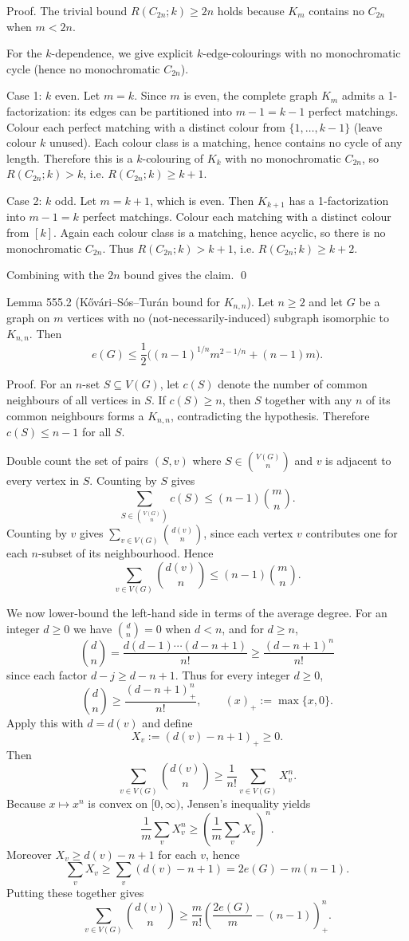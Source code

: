 Proof.
The trivial bound $R(C_{2n};k)\ge 2n$ holds because $K_m$ contains no $C_{2n}$ when $m<2n$.

For the $k$-dependence, we give explicit $k$-edge-colourings with no monochromatic cycle (hence no monochromatic $C_{2n}$).

Case 1: $k$ even.
Let $m=k$. Since $m$ is even, the complete graph $K_m$ admits a 1-factorization: its edges can be partitioned into $m-1=k-1$ perfect matchings.
Colour each perfect matching with a distinct colour from $\{1,\dots,k-1\}$ (leave colour $k$ unused).
Each colour class is a matching, hence contains no cycle of any length.
Therefore this is a $k$-colouring of $K_k$ with no monochromatic $C_{2n}$, so $R(C_{2n};k)>k$, i.e. $R(C_{2n};k)\ge k+1$.

Case 2: $k$ odd.
Let $m=k+1$, which is even.
Then $K_{k+1}$ has a 1-factorization into $m-1=k$ perfect matchings.
Colour each matching with a distinct colour from $[k]$.
Again each colour class is a matching, hence acyclic, so there is no monochromatic $C_{2n}$.
Thus $R(C_{2n};k)>k+1$, i.e. $R(C_{2n};k)\ge k+2$.

Combining with the $2n$ bound gives the claim.
\qed

Lemma 555.2 (K\H{o}v\'ari--S\'os--Tur\'an bound for $K_{n,n}$).
Let $n\ge 2$ and let $G$ be a graph on $m$ vertices with no (not-necessarily-induced) subgraph isomorphic to $K_{n,n}$.
Then
\[
e(G)\le \frac12\Big((n-1)^{1/n} m^{2-1/n}+(n-1)m\Big).
\]

Proof.
For an $n$-set $S\subseteq V(G)$, let $c(S)$ denote the number of common neighbours of all vertices in $S$.
If $c(S)\ge n$, then $S$ together with any $n$ of its common neighbours forms a $K_{n,n}$, contradicting the hypothesis.
Therefore $c(S)\le n-1$ for all $S$.

Double count the set of pairs $(S,v)$ where $S\in\binom{V(G)}{n}$ and $v$ is adjacent to every vertex in $S$.
Counting by $S$ gives
\[
\sum_{S\in\binom{V(G)}{n}} c(S)\le (n-1)\binom{m}{n}.
\tag{1}
\]
Counting by $v$ gives $\sum_{v\in V(G)}\binom{d(v)}{n}$, since each vertex $v$ contributes one for each $n$-subset of its neighbourhood.
Hence
\[
\sum_{v\in V(G)}\binom{d(v)}{n}\le (n-1)\binom{m}{n}.
\tag{1'}
\]

We now lower-bound the left-hand side in terms of the average degree.
For an integer $d\ge 0$ we have $\binom{d}{n}=0$ when $d<n$, and for $d\ge n$,
\[
\binom{d}{n}=\frac{d(d-1)\cdots(d-n+1)}{n!}\ge \frac{(d-n+1)^n}{n!}
\]
since each factor $d-j\ge d-n+1$.
Thus for every integer $d\ge 0$,
\[
\binom{d}{n}\ge \frac{(d-n+1)_+^n}{n!},\qquad (x)_+:=\max\{x,0\}.
\]
Apply this with $d=d(v)$ and define
\[
X_v:=(d(v)-n+1)_+\ge 0.
\]
Then
\[
\sum_{v\in V(G)}\binom{d(v)}{n}\ge \frac{1}{n!}\sum_{v\in V(G)} X_v^n.
\]
Because $x\mapsto x^n$ is convex on $[0,\infty)$, Jensen's inequality yields
\[
\frac{1}{m}\sum_v X_v^n\ge \left(\frac{1}{m}\sum_v X_v\right)^n.
\]
Moreover $X_v\ge d(v)-n+1$ for each $v$, hence
\[
\sum_v X_v\ge \sum_v (d(v)-n+1)=2e(G)-m(n-1).
\]
Putting these together gives
\[
\sum_{v\in V(G)}\binom{d(v)}{n}
\ge \frac{m}{n!}\left(\frac{2e(G)}{m}-(n-1)\right)_+^n.
\tag{2}
\]

